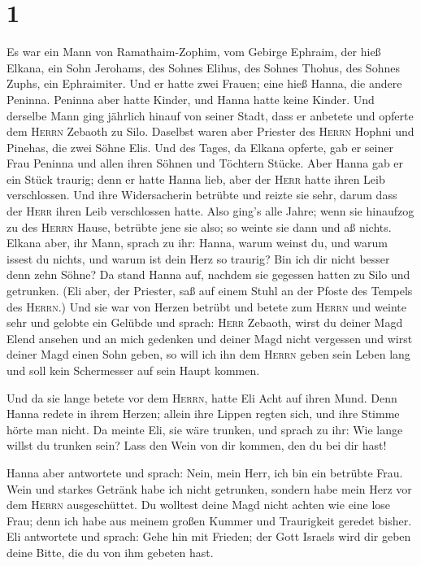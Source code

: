 \hypertarget{section}{%
\section{1}\label{section}}

 Es war ein Mann von Ramathaim-Zophim, vom Gebirge
Ephraim, der hieß Elkana, ein Sohn Jerohams, des Sohnes Elihus, des
Sohnes Thohus, des Sohnes Zuphs, ein Ephraimiter.  Und er
hatte zwei Frauen; eine hieß Hanna, die andere Peninna. Peninna aber
hatte Kinder, und Hanna hatte keine Kinder.  Und derselbe
Mann ging jährlich hinauf von seiner Stadt, dass er anbetete und opferte
dem \textsc{Herrn} Zebaoth zu Silo. Daselbst waren aber Priester des
\textsc{Herrn} Hophni und Pinehas, die zwei Söhne Elis. 
Und des Tages, da Elkana opferte, gab er seiner Frau Peninna und allen
ihren Söhnen und Töchtern Stücke.  Aber Hanna gab er ein
Stück traurig; denn er hatte Hanna lieb, aber der \textsc{Herr} hatte
ihren Leib verschlossen.  Und ihre Widersacherin betrübte
und reizte sie sehr, darum dass der \textsc{Herr} ihren Leib
verschlossen hatte.  Also ging's alle Jahre; wenn sie
hinaufzog zu des \textsc{Herrn} Hause, betrübte jene sie also; so weinte
sie dann und aß nichts.  Elkana aber, ihr Mann, sprach zu
ihr: Hanna, warum weinst du, und warum issest du nichts, und warum ist
dein Herz so traurig? Bin ich dir nicht besser denn zehn Söhne?
 Da stand Hanna auf, nachdem sie gegessen hatten zu Silo
und getrunken. (Eli aber, der Priester, saß auf einem Stuhl an der
Pfoste des Tempels des \textsc{Herrn}.)  Und sie war von
Herzen betrübt und betete zum \textsc{Herrn} und weinte sehr
 und gelobte ein Gelübde und sprach: \textsc{Herr}
Zebaoth, wirst du deiner Magd Elend ansehen und an mich gedenken und
deiner Magd nicht vergessen und wirst deiner Magd einen Sohn geben, so
will ich ihn dem \textsc{Herrn} geben sein Leben lang und soll kein
Schermesser auf sein Haupt kommen.

 Und da sie lange betete vor dem \textsc{Herrn}, hatte
Eli Acht auf ihren Mund.  Denn Hanna redete in ihrem
Herzen; allein ihre Lippen regten sich, und ihre Stimme hörte man nicht.
Da meinte Eli, sie wäre trunken,  und sprach zu ihr: Wie
lange willst du trunken sein? Lass den Wein von dir kommen, den du bei
dir hast!

 Hanna aber antwortete und sprach: Nein, mein Herr, ich
bin ein betrübte Frau. Wein und starkes Getränk habe ich nicht
getrunken, sondern habe mein Herz vor dem \textsc{Herrn} ausgeschüttet.
 Du wolltest deine Magd nicht achten wie eine lose Frau;
denn ich habe aus meinem großen Kummer und Traurigkeit geredet bisher.
 Eli antwortete und sprach: Gehe hin mit Frieden; der
Gott Israels wird dir geben deine Bitte, die du von ihm gebeten hast.

